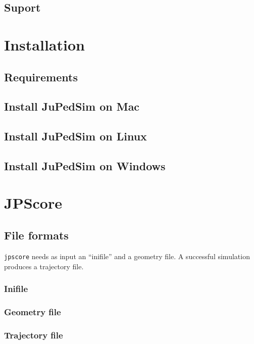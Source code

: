 \documentclass[%
paper=A4,					%
twoside=true,				%
openright,					%
parskip=full,				%
chapterprefix=true,			%
11pt,						%
headings=normal,			%
bibliography=totoc,			%
listof=totoc,				%
titlepage=on,				%
captions=tableabove,		%
draft=false,				%
]{scrreprt}%
\begin{document}
\section{Suport}

\newpage
\chapter{Installation}
\section{Requirements}

\newpage
\section{Install JuPedSim on Mac}

\newpage
\section{Install JuPedSim on Linux}

\newpage
\section{Install JuPedSim on Windows}

\newpage

 \chapter{JPScore}
\section{File formats}
\texttt{jpscore} needs as input an ``inifile'' and a geometry file. A successful simulation produces a trajectory file.

\subsection{Inifile}

\newpage
\subsection{Geometry file}
\label{sec:geo}

\newpage
\subsection{Trajectory file}
\label{sec:traj}

\end{document}
